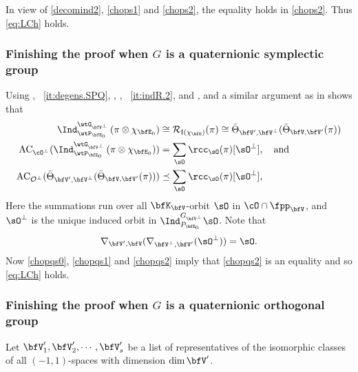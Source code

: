 \documentclass[12pt,a4paper]{amsart}
\newcommand{\AC}{\mathrm{AC}}
\newcommand{\CO}{{\mathcal {O}}}
\newcommand{\CR}{{\mathcal {R}}}
\newcommand{\RI}{{\mathrm {I}}}
\def\DD{\nabla}
\numberwithin{equation}{section}
\theoremstyle{remark}
\def\abfV{\bfV'}
\def\Thetab{\bar{\Theta}}
\def\sOpe{\sO^\perp}
\def\bfVpe{\bfV^\perp}
\begin{document}
In view of \cref{decomind2}, \cref{chops1} and \cref{chops2},
the equality holds in \eqref{chops2}. Thus \cref{eq:LCh} holds. %


\subsubsection{Finishing the proof when $G$ is a quaternionic symplectic group}

Using , ~\ref{it:degens.SPQ}, , ,
~\ref{it:indR.2}, \cite[Theorem~1.4]{SV} and , and a
similar argument as in  shows that
\begin{align}\label{chopqs0}
  \Ind_{\wtP_{\bfE_0}}^{\wtG_{\bfVpe}} \left(\pi\otimes
  \chi_{\bfE_0}\right) & \cong \CR_{\RI(\chi_{\bfE})} (\pi)\cong \Thetab_{\abfV,\bfVpe}(\Thetab_{\bfV,\abfV}(\pi))\\
  \label{chopqs1}
  \AC_{\cO^\perp}(\Ind_{\wtP_{\bfE_0}}^{\wtG_{\bfVpe}} \left(\pi\otimes
  \chi_{\bfE_0}\right))
  &  = \sum_{\sO} \rcc_\sO(\pi) [\sOpe ], \quad \text{and}\\
  \label{chopqs2}
  \AC_{\CO^\perp}(\Thetab_{\abfV,\bfVpe}(\Thetab_{\bfV,\abfV}(\pi))) &\preceq \sum_{\sO} \rcc_\sO(\pi) [\sOpe ],
\end{align}
  Here
  the summations run over all
  $\bfK_{\bfV}$-orbit $\sO$ in  $\cO\cap \fpp_{\bfV}$, and $\sOpe$ is the unique induced orbit in $\Ind_{P_{\bfE_0}}^{G_{\bfVpe}}\sO$.
  Note that
   \[
 \DD_{\abfV,\bfV} (\DD_{\bfVpe,\abfV}(\sO^\perp))=\sO.
\]
Now \eqref{chopqs0}, \eqref{chopqs1} and \eqref{chopqs2}
imply that \eqref{chopqs2} is an equality and so \cref{eq:LCh} holds.


\subsubsection{Finishing the proof when $G$ is a quaternionic orthogonal group}


Let $\abfV_1, \abfV_2, \cdots, \abfV_s$ be a
list of representatives of the isomorphic  classes of all $(-1,
1)$-spaces with dimension $\dim \abfV$.
\end{document}
